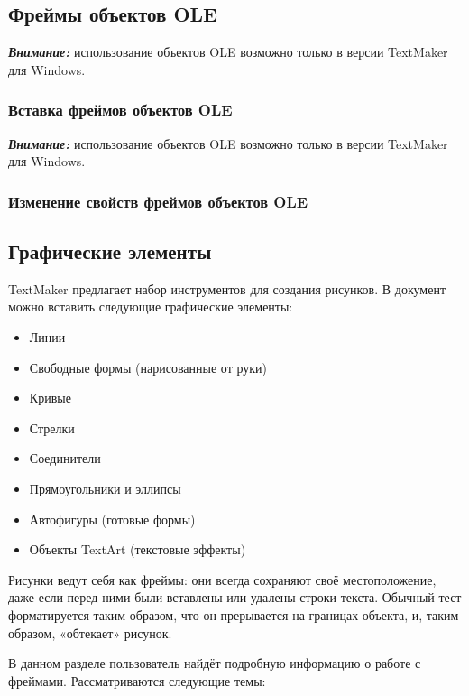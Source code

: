 \documentclass[a4paper,10pt]{article}
\begin{document}
\subsection{Фреймы объектов OLE}
\begin{mdframed}[backgroundcolor=blue!10]
\textbf{\textit{Внимание:}} использование объектов OLE возможно только в версии TextMaker для Windows.
\end{mdframed}



\subsubsection{Вставка фреймов объектов OLE}
\begin{mdframed}[backgroundcolor=blue!10]
\textbf{\textit{Внимание:}} использование объектов OLE возможно только в версии TextMaker для Windows.
\end{mdframed}

\subsubsection{Изменение свойств фреймов объектов OLE}
\subsection{Графические элементы}
TextMaker предлагает набор инструментов для создания рисунков. В документ можно вставить следующие графические элементы:
\begin{itemize}
 \item Линии
 \item Свободные формы (нарисованные от руки)
 \item Кривые
 \item Стрелки
 \item Соединители
 \item Прямоугольники и эллипсы
 \item Автофигуры (готовые формы)
 \item Объекты TextArt (текстовые эффекты)
\end{itemize}

Рисунки ведут себя как фреймы: они всегда сохраняют своё местоположение, даже если перед ними были вставлены или удалены строки текста. Обычный тест форматируется таким образом, что он прерывается на границах объекта, и, таким образом, «обтекает» рисунок.

В данном разделе пользователь найдёт подробную информацию о работе с фреймами. Рассматриваются следующие темы:
\end{document}
